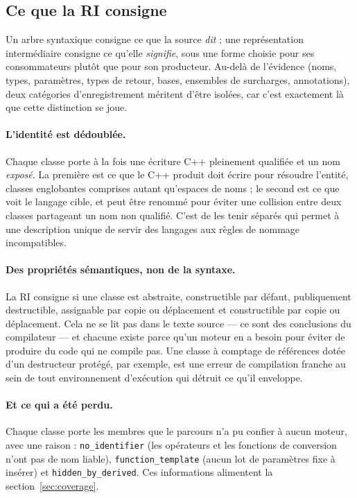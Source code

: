 \documentclass[11pt,a4paper]{article}
\newcommand{\code}[1]{\texttt{\small #1}}
\begin{document}
\subsection{Ce que la RI consigne}

Un arbre syntaxique consigne ce que la source \emph{dit} ; une représentation
intermédiaire consigne ce qu'elle \emph{signifie}, sous une forme choisie pour
ses consommateurs plutôt que pour son producteur. Au-delà de l'évidence (noms,
types, paramètres, types de retour, bases, ensembles de surcharges,
annotations), deux catégories d'enregistrement méritent d'être isolées, car
c'est exactement là que cette distinction se joue.

\paragraph{L'identité est dédoublée.} Chaque classe porte à la fois une écriture
C++ pleinement qualifiée et un nom \emph{exposé}. La première est ce que le C++
produit doit écrire pour résoudre l'entité, classes englobantes comprises autant
qu'espaces de noms ; le second est ce que voit le langage cible, et peut être
renommé pour éviter une collision entre deux classes partageant un nom non
qualifié. C'est de les tenir séparés qui permet à une description unique de
servir des langages aux règles de nommage incompatibles.

\paragraph{Des propriétés sémantiques, non de la syntaxe.} La RI consigne si une
classe est abstraite, constructible par défaut, publiquement destructible,
assignable par copie ou déplacement et constructible par copie ou déplacement.
Cela ne se lit pas dans le texte source --- ce sont des conclusions du
compilateur --- et chacune existe parce qu'un moteur en a besoin pour éviter de
produire du code qui ne compile pas. Une classe à comptage de références dotée
d'un destructeur protégé, par exemple, est une erreur de compilation franche au
sein de tout environnement d'exécution qui détruit ce qu'il enveloppe.

\paragraph{Et ce qui a été perdu.} Chaque classe porte les membres que le
parcours n'a pu confier à aucun moteur, avec une raison : \code{no\_identifier}
(les opérateurs et les fonctions de conversion n'ont pas de nom liable),
\code{function\_template} (aucun lot de paramètres fixe à insérer) et
\code{hidden\_by\_derived}. Ces informations alimentent la
section~\ref{sec:coverage}.
\end{document}
